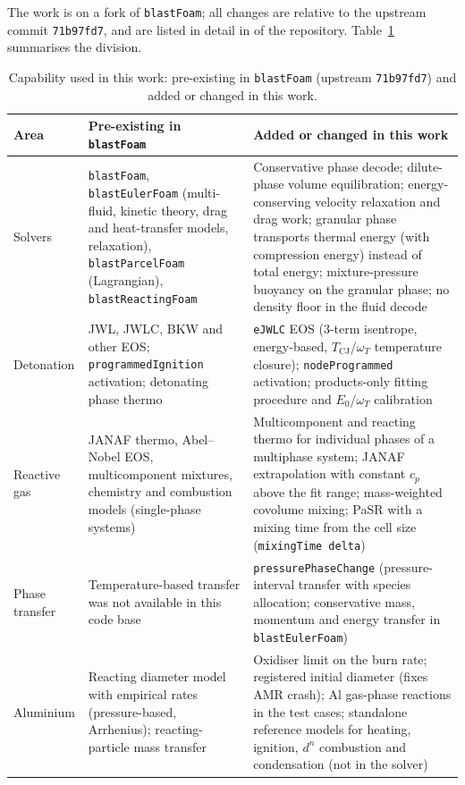 \documentclass{article}
\begin{document}
The work is on a fork of \texttt{blastFoam}; all changes are relative to the upstream commit \texttt{71b97fd7}, and are listed in detail in  of the repository. Table~\ref{tab:provenance} summarises the division.

\begin{table}[htbp]
    \centering
    \footnotesize
    \caption{Capability used in this work: pre-existing in \texttt{blastFoam} (upstream \texttt{71b97fd7}) and added or changed in this work.}
    \label{tab:provenance}
    \begin{tabularx}{\textwidth}{>{\raggedright\arraybackslash}p{3.0cm}>{\raggedright\arraybackslash}X>{\raggedright\arraybackslash}X}
        \toprule
        \textbf{Area} & \textbf{Pre-existing in \texttt{blastFoam}} & \textbf{Added or changed in this work} \\
        \midrule
        Solvers & \texttt{blastFoam}, \texttt{blastEulerFoam} (multi-fluid, kinetic theory, drag and heat-transfer models, relaxation), \texttt{blastParcelFoam} (Lagrangian), \texttt{blastReactingFoam} & Conservative phase decode; dilute-phase volume equilibration; energy-conserving velocity relaxation and drag work; granular phase transports thermal energy (with compression energy) instead of total energy; mixture-pressure buoyancy on the granular phase; no density floor in the fluid decode \\
        Detonation & JWL, JWLC, BKW and other EOS; \texttt{programmedIgnition} activation; detonating phase thermo & \texttt{eJWLC} EOS (3-term isentrope, energy-based, $T_\text{CJ}$/$\omega_T$ temperature closure); \texttt{nodeProgrammed} activation; products-only fitting procedure and $E_0$/$\omega_T$ calibration \\
        Reactive gas & JANAF thermo, Abel--Nobel EOS, multicomponent mixtures, chemistry and combustion models (single-phase systems) & Multicomponent and reacting thermo for individual phases of a multiphase system; JANAF extrapolation with constant $c_p$ above the fit range; mass-weighted covolume mixing; PaSR with a mixing time from the cell size (\texttt{mixingTime delta}) \\
        Phase transfer & Temperature-based transfer was not available in this code base & \texttt{pressurePhaseChange} (pressure-interval transfer with species allocation; conservative mass, momentum and energy transfer in \texttt{blastEulerFoam}) \\
        Aluminium & Reacting diameter model with empirical rates (pressure-based, Arrhenius); reacting-particle mass transfer & Oxidiser limit on the burn rate; registered initial diameter (fixes AMR crash); Al gas-phase reactions in the test cases; standalone reference models for heating, ignition, $d^n$ combustion and condensation (not in the solver) \\

\end{tabularx}
\end{table}
\end{document}
